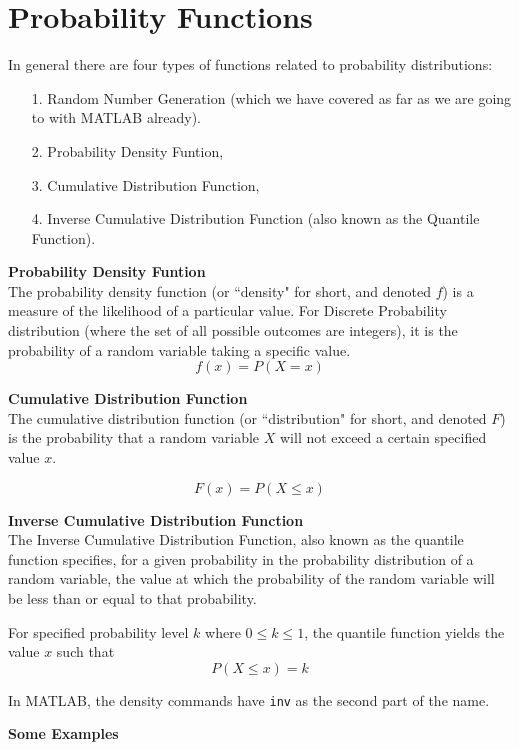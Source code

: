 \documentclass[]{report}
\begin{document}
{\section{Probability Functions}
In general there are four types of functions related to probability
distributions:
\begin{itemize}
\item[1.] Random Number Generation (which we have covered as far as we are going to with MATLAB already).
\item[2.] Probability Density Funtion,
\item[3.] Cumulative Distribution Function,
\item[4.] Inverse Cumulative Distribution Function (also known as the Quantile Function).
\end{itemize}
\noindent \textbf{Probability Density Funtion}\\
The probability density function (or ``density" for short, and denoted $f$) is a measure of the likelihood of a particular value. For Discrete
Probability distribution (where the set of all possible outcomes are integers), it is the probability of a random variable taking a specific value.
\[ f(x) = P(X = x)\]

\noindent \textbf{Cumulative Distribution Function}\\
The cumulative distribution function (or ``distribution" for short, and denoted $F$)
is the probability that a random variable $X$ will not exceed a certain specified value $x$.

\[ F(x) = P(X \leq x)\]



\noindent \textbf{Inverse Cumulative Distribution Function}\\
The Inverse Cumulative Distribution Function, also known as
the quantile function specifies, for a given probability in the probability distribution of a random variable, the value at which the probability of the random variable will be less than or equal to that probability.

For specified probability level $k$ where $0 \leq k \leq  1$, the quantile function yields the value $x$ such that
\[ P(X \leq x) = k \]

\noindent In MATLAB, the density commands have \texttt{inv} as the second part of the name.

\noindent \textbf{Some Examples}\\

}
\end{document}
